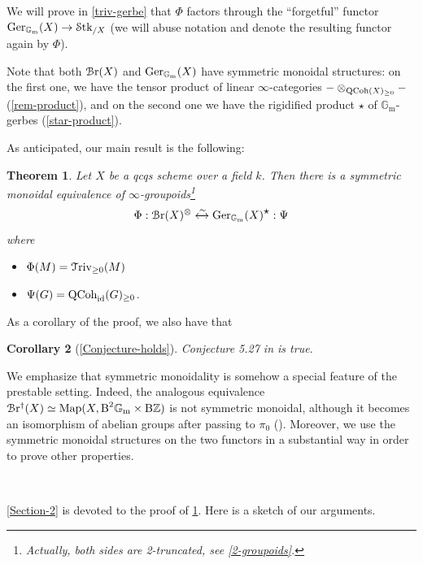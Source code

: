 \documentclass[11pt, twoside]{article} %
\numberwithin{equation}{section}
\theoremstyle{plain}
\newtheorem{thm}{Theorem}[section]
\newtheorem{cor}[thm]{Corollary}
\theoremstyle{definition}
\newcommand{\B}{\textup{B}}
\newcommand{\Z}{\mathbb Z}
\newcommand{\Map}{\textup{Map}}
\newcommand{\Gm}{\mathbb G_{\mathrm{m}}}
\newcommand{\id}{\textup{id}}
\newcommand{\QCoh}{\textup{QCoh}}
\newcommand{\Triv}{\mathcal{T}\textup{riv}}
\newcommand{\cBr}{\mathcal{B}\textup{r}}
\newcommand{\cBre}{\mathcal{B}\textup{r}^\dagger}
\newcommand{\Ger}{\textup{Ger}}
\newcommand{\Stk}{{\mathcal S\textup{tk}}}
\begin{document}
 We will prove in \cref{triv-gerbe} that $\Phi$ factors through the ``forgetful'' functor $\Ger_{\Gm}(X)\to \Stk_{/X}$ (we will abuse notation and denote the resulting functor again by $\Phi$).
 
 Note that both $\cBr(X)$ and $\Ger_{\Gm}(X)$ have symmetric monoidal structures: on the first one, we have the tensor product of linear $\infty$-categories $-\otimes_{\QCoh(X)_{\geq 0}}-$ (\cref{rem-product}), and on the second one we have the rigidified product $\star$ of $\Gm$-gerbes (\cref{star-product}).
 
As anticipated, our main result is the following:

 \begin{thm}\label{main-theorem}
		Let $X$ be a qcqs scheme over a field $k$. Then there is a symmetric monoidal equivalence of $\infty$-groupoids\footnote{Actually, both sides are 2-truncated, see \cref{2-groupoids}.}
		$$\Phi:\cBr(X)^{\otimes}\xleftrightarrow{\sim} \Ger_{\Gm}(X)^{\mathlarger \star}:\Psi$$
		where
		\begin{itemize}
			\item $\Phi(M)=\Triv_{\geq 0}(M)$
			\item $\Psi(G)=\QCoh_\id(G)_{\geq 0}$.
		\end{itemize}
	\end{thm}
 As a corollary of the proof, we also have that 
 \begin{cor}[{\cref{Conjecture-holds}}]
     Conjecture 5.27 in \cite{BP} is true.
 \end{cor}

 We emphasize that symmetric monoidality is somehow a special feature of the prestable setting. Indeed, the analogous equivalence $\cBre(X)\simeq \Map(X,\B^2\Gm\times \B\Z)$ is not symmetric monoidal, although it becomes an isomorphism of abelian groups after passing to $\pi_0$ (\cite[Remark 11.5.5.4,11.5.5.5]{SAG}). Moreover, we use the symmetric monoidal structures on the two functors in a substantial way in order to prove other properties.

\

 \cref{Section-2} is devoted to the proof of \cref{main-theorem}. Here is a sketch of our arguments.
 
\end{document}
